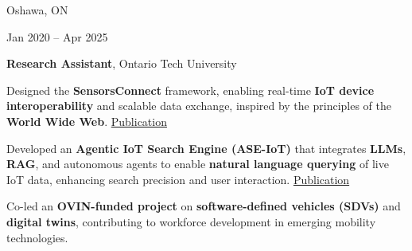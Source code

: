 \vspace{0.2cm}

        \begin{twocolentry}{
    Oshawa, ON

    Jan 2020 – Apr 2025
    }
    \textbf{Research Assistant}, Ontario Tech University
    \begin{highlights}
        \item Designed the \textbf{SensorsConnect} framework, enabling real-time \textbf{IoT device interoperability} and scalable data exchange, inspired by the principles of the \textbf{World Wide Web}. \href{https://ieeexplore.ieee.org/document/10752393}{Publication}
        \item Developed an \textbf{Agentic IoT Search Engine (ASE-IoT)} that integrates \textbf{LLMs}, \textbf{RAG}, and autonomous agents to enable \textbf{natural language querying} of live IoT data, enhancing search precision and user interaction. \href{https://arxiv.org/abs/2503.12255}{Publication}
        \item Co-led an \textbf{OVIN-funded project} on \textbf{software-defined vehicles (SDVs)} and \textbf{digital twins}, contributing to workforce development in emerging mobility technologies.
    \end{highlights}
\end{twocolentry}



    
